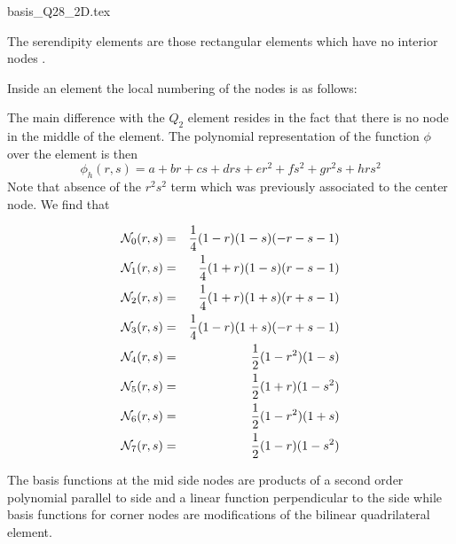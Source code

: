 \begin{flushright} {\tiny {\color{gray} basis\_Q28\_2D.tex}} \end{flushright}

The serendipity elements are those rectangular elements which have no
interior nodes \cite[p65]{reddybook2}.

Inside an element the local numbering of the nodes is as follows:



The main difference with the $Q_2$ element resides in the fact that there is 
no node in the middle of the element.
The polynomial representation of the function $\phi$ over the element is then
\[
\phi_h(r,s) = a + br + cs + drs + er^2 + fs^2 + gr^2s + hrs^2
\]
Note that absence of the $r^2s^2$ term which was previously associated 
to the center node. We find that 
\begin{mdframed}[backgroundcolor=blue!5]
\begin{eqnarray}
{\mathcal{N}}_0(r,s)&=& \frac{1}{4}(1-r)(1-s)(-r-s-1) \\
{\mathcal{N}}_1(r,s)&=& \frac{1}{4}(1+r)(1-s)(r-s-1) \\
{\mathcal{N}}_2(r,s)&=& \frac{1}{4}(1+r)(1+s)(r+s-1) \\
{\mathcal{N}}_3(r,s)&=& \frac{1}{4}(1-r)(1+s)(-r+s-1) \\
{\mathcal{N}}_4(r,s)&=& \frac{1}{2}(1-r^2)(1-s)  \\
{\mathcal{N}}_5(r,s)&=& \frac{1}{2}(1+r)  (1-s^2)\\
{\mathcal{N}}_6(r,s)&=& \frac{1}{2}(1-r^2)(1+s)  \\
{\mathcal{N}}_7(r,s)&=& \frac{1}{2}(1-r)  (1-s^2)
\end{eqnarray}
\end{mdframed}

The basis functions at the mid side nodes are products of a 
second order polynomial parallel to side and 
a linear function perpendicular to the side
while basis functions for corner nodes are modifications of the bilinear
quadrilateral element.

